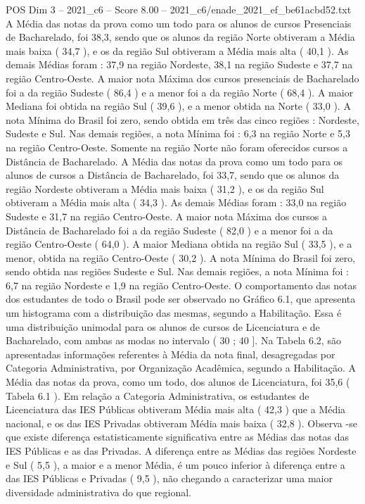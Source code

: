 \begin{textsample}{POS Dim 3 – 2021\_c6 – Score 8.00 – 2021\_c6/enade\_2021\_ef\_be61acbd52.txt}
A Média das notas da prova como um todo para os alunos de cursos Presenciais de Bacharelado, foi 38,3, sendo que os alunos da região Norte obtiveram a Média mais baixa ( 34,7 ), e os da região Sul obtiveram a Média mais alta ( 40,1 ).
As demais Médias foram : 37,9 na região Nordeste, 38,1 na região Sudeste e 37,7 na região Centro-Oeste.
A maior nota Máxima dos cursos presenciais de Bacharelado foi a da região Sudeste ( 86,4 ) e a menor foi a da região Norte ( 68,4 ).
A maior Mediana foi obtida na região Sul ( 39,6 ), e a menor obtida na Norte ( 33,0 ).
A nota Mínima do Brasil foi zero, sendo obtida em três das cinco regiões : Nordeste, Sudeste e Sul.
Nas demais regiões, a nota Mínima foi : 6,3 na região Norte e 5,3 na região Centro-Oeste.
Somente na região Norte não foram oferecidos cursos a Distância de Bacharelado.
A Média das notas da prova como um todo para os alunos de cursos a Distância de Bacharelado, foi 33,7, sendo que os alunos da região Nordeste obtiveram a Média mais baixa ( 31,2 ), e os da região Sul obtiveram a Média mais alta ( 34,3 ).
As demais Médias foram : 33,0 na região Sudeste e 31,7 na região Centro-Oeste.
A maior nota Máxima dos cursos a Distância de Bacharelado foi a da região Sudeste ( 82,0 ) e a menor foi a da região Centro-Oeste ( 64,0 ).
A maior Mediana obtida na região Sul ( 33,5 ), e a menor, obtida na região Centro-Oeste ( 30,2 ).
A nota Mínima do Brasil foi zero, sendo obtida nas regiões Sudeste e Sul.
Nas demais regiões, a nota Mínima foi : 6,7 na região Nordeste e 1,9 na região Centro-Oeste.
O comportamento das notas dos estudantes de todo o Brasil pode ser observado no Gráfico 6.1, que apresenta um histograma com a distribuição das mesmas, segundo a Habilitação.
Essa é uma distribuição unimodal para os alunos de cursos de Licenciatura e de Bacharelado, com ambas as modas no intervalo ( 30 ; 40 ].
Na Tabela 6.2, são apresentadas informações referentes à Média da nota final, desagregadas por Categoria Administrativa, por Organização Acadêmica, segundo a Habilitação.
A Média das notas da prova, como um todo, dos alunos de Licenciatura, foi 35,6 ( Tabela 6.1 ).
Em relação a Categoria Administrativa, os estudantes de Licenciatura das IES Públicas obtiveram Média mais alta ( 42,3 ) que a Média nacional, e os das IES Privadas obtiveram Média mais baixa ( 32,8 ).
Observa -se que existe diferença estatisticamente significativa entre as Médias das notas das IES Públicas e as das Privadas.
A diferença entre as Médias das regiões Nordeste e Sul ( 5,5 ), a maior e a menor Média, é um pouco inferior à diferença entre a das IES Públicas e Privadas ( 9,5 ), não chegando a caracterizar uma maior diversidade administrativa do que regional.

\end{textsample}
